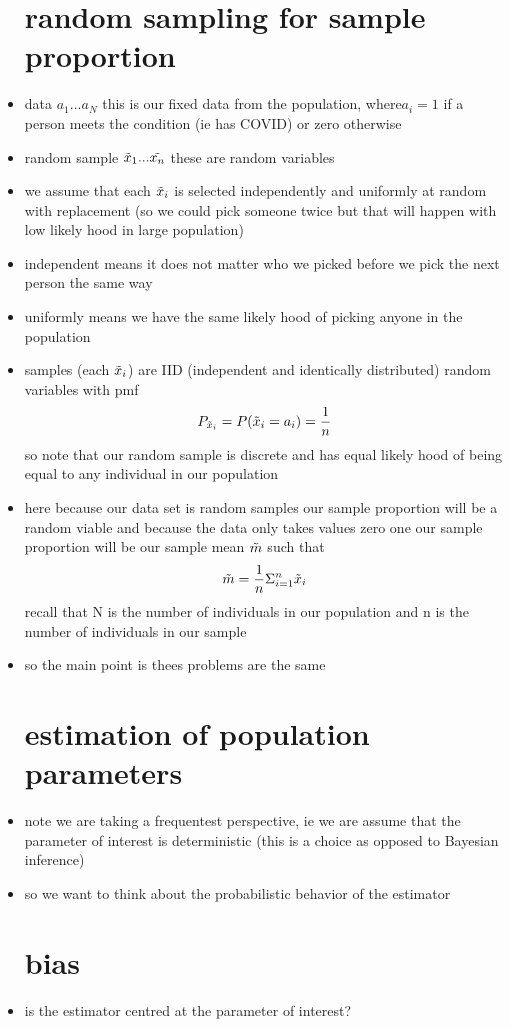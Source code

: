 \documentclass{article}
\begin{document}
\begin{itemize}
\section{random sampling for sample proportion}
\item data $a_1...a_N$ this is our fixed data from the population, where$a_i=1$ if a person meets the condition (ie has COVID) or zero otherwise
\item random sample $\Tilde{x}_1...\Tilde{x_n}$ these are random variables 
\item we assume that each $\Tilde{x}_i$ is selected independently and uniformly at random with replacement (so we could pick someone twice but that will happen with low likely hood in large population)
\item independent means it does not matter who we picked before we pick the next person the same way 
\item uniformly means we have the same likely hood of picking anyone in the population 
\item samples (each $\Tilde{x}_i$) are IID (independent and identically distributed) random variables with pmf $$P_{\Tilde{x}_i}=P(\Tilde{x}_i=a_i)=\frac{1}{n}$$
so note that our random sample is discrete and has equal likely hood of being equal to any individual in our population 
\item here because our data set is random samples our sample proportion  will be a random viable and because the data only takes values zero one our sample proportion will be our sample mean  $\Tilde{m}$ such that $$\Tilde{m}=\frac{1}{n}\Sigma_{i=1}^{n}\Tilde{x}_i$$ recall that N is the number of individuals in our population and n is the number of individuals in our sample
\item so the main point is thees problems are the same 
\section{estimation of population parameters}
\item note we are taking a frequentest perspective, ie we are assume that the parameter of interest is deterministic (this is a choice  as opposed to Bayesian inference) 
\item so we want to think about the probabilistic behavior of the estimator
\section{bias}
\item is the estimator centred at the parameter of interest? 

\end{itemize}
\end{document}
